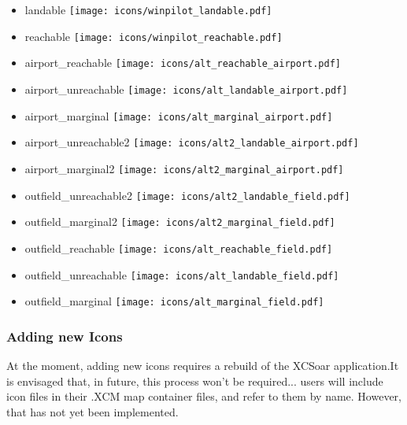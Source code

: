 \begin{itemize}
\item landable \texttt{[image: icons/winpilot\_landable.pdf]}
\item reachable \texttt{[image: icons/winpilot\_reachable.pdf]}
\item airport\_reachable \texttt{[image: icons/alt\_reachable\_airport.pdf]}
\item airport\_unreachable \texttt{[image: icons/alt\_landable\_airport.pdf]}
\item airport\_marginal \texttt{[image: icons/alt\_marginal\_airport.pdf]}
\item airport\_unreachable2 \texttt{[image: icons/alt2\_landable\_airport.pdf]}
\item airport\_marginal2 \texttt{[image: icons/alt2\_marginal\_airport.pdf]}
\item outfield\_unreachable2 \texttt{[image: icons/alt2\_landable\_field.pdf]}
\item outfield\_marginal2 \texttt{[image: icons/alt2\_marginal\_field.pdf]}
\item outfield\_reachable \texttt{[image: icons/alt\_reachable\_field.pdf]}
\item outfield\_unreachable \texttt{[image: icons/alt\_landable\_field.pdf]}
\item outfield\_marginal \texttt{[image: icons/alt\_marginal\_field.pdf]}
\end{itemize}
\subsubsection{Adding new Icons}
At the moment, adding new icons requires a rebuild of the XCSoar application.It is envisaged that, in future, 
this process won't be required... users will include icon files in their .XCM map container files, and refer to them 
by name. However, that has not yet been implemented. 

